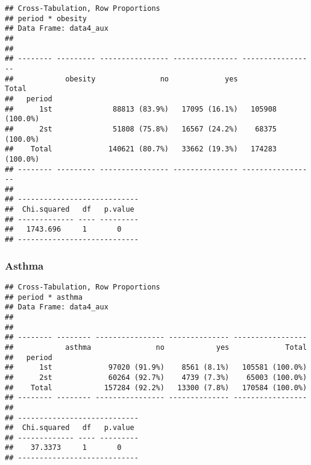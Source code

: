 \documentclass[
]{article}
\newenvironment{Shaded}{\begin{snugshade}}{\end{snugshade}}
\newcommand{\DataTypeTok}[1]{\textcolor[rgb]{0.13,0.29,0.53}{#1}}
\newcommand{\KeywordTok}[1]{\textcolor[rgb]{0.13,0.29,0.53}{\textbf{#1}}}
\newcommand{\NormalTok}[1]{#1}
\newcommand{\OperatorTok}[1]{\textcolor[rgb]{0.81,0.36,0.00}{\textbf{#1}}}
\newcommand{\OtherTok}[1]{\textcolor[rgb]{0.56,0.35,0.01}{#1}}
\newcommand{\StringTok}[1]{\textcolor[rgb]{0.31,0.60,0.02}{#1}}
\begin{document}
\begin{verbatim}
## Cross-Tabulation, Row Proportions  
## period * obesity  
## Data Frame: data4_aux  
## 
## 
## -------- --------- ---------------- --------------- -----------------
##            obesity               no             yes             Total
##   period                                                             
##      1st              88813 (83.9%)   17095 (16.1%)   105908 (100.0%)
##      2st              51808 (75.8%)   16567 (24.2%)    68375 (100.0%)
##    Total             140621 (80.7%)   33662 (19.3%)   174283 (100.0%)
## -------- --------- ---------------- --------------- -----------------
## 
## ----------------------------
##  Chi.squared   df   p.value 
## ------------- ---- ---------
##   1743.696     1       0    
## ----------------------------
\end{verbatim}

\hypertarget{asthma}{%
\subsubsection{Asthma}\label{asthma}}

\begin{Shaded}
\end{Shaded}

\begin{verbatim}
## Cross-Tabulation, Row Proportions  
## period * asthma  
## Data Frame: data4_aux  
## 
## 
## -------- -------- ---------------- -------------- -----------------
##            asthma               no            yes             Total
##   period                                                           
##      1st             97020 (91.9%)    8561 (8.1%)   105581 (100.0%)
##      2st             60264 (92.7%)    4739 (7.3%)    65003 (100.0%)
##    Total            157284 (92.2%)   13300 (7.8%)   170584 (100.0%)
## -------- -------- ---------------- -------------- -----------------
## 
## ----------------------------
##  Chi.squared   df   p.value 
## ------------- ---- ---------
##    37.3373     1       0    
## ----------------------------
\end{verbatim}
\end{document}
